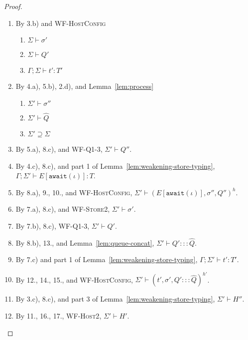 \begin{proof}
\begin{itemize}
\begin{enumerate}
\item By 3.b) and \textsc{WF-HostConfig}
  \begin{enumerate}[label=(\alph*)]
  \item $\Sigma \vdash \sigma'$
  \item $\Sigma \vdash Q'$
  \item $\Gamma ; \Sigma \vdash t' : T'$
  \end{enumerate}
\item By 4.a), 5.b), 2.d), and Lemma~\ref{lem:process}
  \begin{enumerate}[label=(\alph*)]
  \item $\Sigma' \vdash \sigma''$
  \item $\Sigma' \vdash \hat{Q}$
  \item $\Sigma' \supseteq \Sigma$
  \end{enumerate}
\item By 5.a), 8.c), and \textsc{WF-Q1-3}, $\Sigma' \vdash Q''$.
\item By 4.c), 8.c), and part 1 of Lemma~\ref{lem:weakening-store-typing}, $\Gamma ; \Sigma' \vdash E[\texttt{await}(\iota)] : T$.
\item By 8.a), 9., 10., and \textsc{WF-HostConfig}, $\Sigma' \vdash (E[\texttt{await}(\iota)], \sigma'', Q'')^h$.
\item By 7.a), 8.c), and \textsc{WF-Store2}, $\Sigma' \vdash \sigma'$.
\item By 7.b), 8.c), \textsc{WF-Q1-3}, $\Sigma' \vdash Q'$.
\item By 8.b), 13., and Lemma~\ref{lem:queue-concat}, $\Sigma' \vdash Q' ::: \hat{Q}$.
\item By 7.c) and part 1 of Lemma~\ref{lem:weakening-store-typing}, $\Gamma ; \Sigma' \vdash t' : T'$.
\item By 12., 14., 15., and \textsc{WF-HostConfig}, $\Sigma' \vdash (t', \sigma', Q' ::: \hat{Q})^{h'}$.
\item By 3.c), 8.c), and part 3 of Lemma~\ref{lem:weakening-store-typing}, $\Sigma' \vdash H''$.
\item By 11., 16., 17., \textsc{WF-Host2}, $\Sigma' \vdash H'$.
\end{enumerate}

\end{itemize}

\end{proof}
